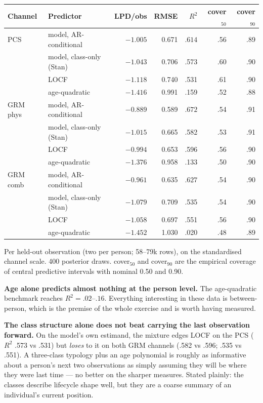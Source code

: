 \documentclass[11pt]{article}
\begin{document}
\begin{center}\small
\begin{tabular}{llrrrrr}
\toprule
Channel & Predictor & LPD/obs & RMSE & $R^2$ & cover$_{50}$ & cover$_{90}$ \\
\midrule
PCS & model, AR-conditional & $\mathbf{-1.005}$ & 0.671 & $\mathbf{.614}$ & .56 & .89 \\
 & model, class-only (Stan) & $-1.043$ & 0.706 & .573 & .60 & .90 \\
 & LOCF & $-1.118$ & 0.740 & .531 & .61 & .90 \\
 & age-quadratic & $-1.416$ & 0.991 & .159 & .52 & .88 \\
\addlinespace
GRM phys & model, AR-conditional & $\mathbf{-0.889}$ & 0.589 & $\mathbf{.672}$ & .54 & .91 \\
 & model, class-only (Stan) & $-1.015$ & 0.665 & .582 & .53 & .91 \\
 & LOCF & $-0.994$ & 0.653 & .596 & .56 & .90 \\
 & age-quadratic & $-1.376$ & 0.958 & .133 & .50 & .90 \\
\addlinespace
GRM comb & model, AR-conditional & $\mathbf{-0.961}$ & 0.635 & $\mathbf{.627}$ & .54 & .90 \\
 & model, class-only (Stan) & $-1.079$ & 0.709 & .535 & .54 & .90 \\
 & LOCF & $-1.058$ & 0.697 & .551 & .56 & .90 \\
 & age-quadratic & $-1.452$ & 1.030 & .020 & .48 & .89 \\
\bottomrule
\end{tabular}

{\scriptsize Per held-out observation (two per person; 58--79k rows), on the
standardised channel scale. 400 posterior draws. cover$_{50}$ and
cover$_{90}$ are the empirical coverage of central predictive intervals
with nominal 0.50 and 0.90.}
\end{center}

\textbf{Age alone predicts almost nothing at the person level.} The
age-quadratic benchmark reaches $R^2 = .02$--$.16$. Everything interesting
in these data is between-person, which is the premise of the whole exercise
and is worth having measured.

\textbf{The class structure alone does not beat carrying the last
observation forward.} On the model's own estimand, the mixture edges LOCF on
the PCS ($R^2$ .573 vs .531) but \emph{loses} to it on both GRM channels
(.582 vs .596; .535 vs .551). A three-class typology plus an age polynomial
is roughly as informative about a person's next two observations as simply
assuming they will be where they were last time --- no better on the sharper
measures. Stated plainly: the classes describe lifecycle shape well, but
they are a coarse summary of an individual's current position.
\end{document}
